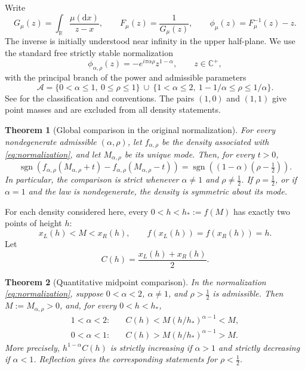\documentclass[11pt,a4paper]{article}
\newtheorem{theorem}{Theorem}[section]
\theoremstyle{definition}
\theoremstyle{remark}
\numberwithin{equation}{section}
\newcommand{\R}{\mathbb{R}}
\newcommand{\Cplus}{\mathbb{C}^{+}}
\newcommand{\sign}{\operatorname{sgn}}
\newcommand{\hp}{h_\ast}
\begin{document}
Write
\[
 G_\mu(z)=\int_{\R}\frac{\mu(\mathrm dx)}{z-x},\qquad
 F_\mu(z)=\frac1{G_\mu(z)},\qquad
 \phi_\mu(z)=F_\mu^{-1}(z)-z .
\]
The inverse is initially understood near infinity in the upper
half-plane. We use the standard free strictly stable normalization
\begin{equation}\label{eq:normalization}
 \phi_{\alpha,\rho}(z)=-e^{i\pi\alpha\rho}z^{1-\alpha},
 \qquad z\in\Cplus ,
\end{equation}
with the principal branch of the power and admissible parameters
\begin{equation}\label{eq:admissible}
 \mathcal A=
 \{0<\alpha\le1,\ 0\le\rho\le1\}
 \ \cup\
 \{1<\alpha\le2,\ 1-1/\alpha\le\rho\le1/\alpha\}.
\end{equation}
See \cite{BP,HK,HSW} for the classification and conventions. The pairs
$(1,0)$ and $(1,1)$ give point masses and are excluded from all density
statements.

\begin{theorem}[Global comparison in the original normalization]
\label{thm:strict}
For every nondegenerate admissible $(\alpha,\rho)$, let
$f_{\alpha,\rho}$ be the density associated with
\eqref{eq:normalization}, and let $M_{\alpha,\rho}$ be its unique mode.
Then, for every $t>0$,
\begin{equation}\label{eq:main}
 \boxed{\;
 \sign\!\left(
 f_{\alpha,\rho}(M_{\alpha,\rho}+t)
 -f_{\alpha,\rho}(M_{\alpha,\rho}-t)\right)
 =
 \sign\!\left((1-\alpha)(\rho-\tfrac12)\right).
 \;}
\end{equation}
In particular, the comparison is strict whenever
$\alpha\ne1$ and $\rho\ne\tfrac12$. If $\rho=\tfrac12$, or if
$\alpha=1$ and the law is nondegenerate, the density is symmetric about
its mode.
\end{theorem}

For each density considered here, every $0<h<\hp:=f(M)$ has exactly two
points of height $h$:
\[
 x_L(h)<M<x_R(h),\qquad
 f(x_L(h))=f(x_R(h))=h.
\]
Let
\begin{equation}\label{eq:midpoint-def}
 C(h)=\frac{x_L(h)+x_R(h)}2.
\end{equation}

\begin{theorem}[Quantitative midpoint comparison]
\label{thm:midpoint}
In the normalization \eqref{eq:normalization}, suppose
$0<\alpha<2$, $\alpha\ne1$, and $\rho>\tfrac12$ is admissible.
Then $M:=M_{\alpha,\rho}>0$, and, for every $0<h<\hp$,
\begin{align}
 1<\alpha<2:\quad&
 C(h)<M(h/\hp)^{\alpha-1}<M,
 \label{eq:midpoint-upper}\\
 0<\alpha<1:\quad&
 C(h)>M(h/\hp)^{\alpha-1}>M.
 \label{eq:midpoint-lower}
\end{align}
More precisely, $h^{1-\alpha}C(h)$ is strictly increasing if
$\alpha>1$ and strictly decreasing if $\alpha<1$.
Reflection gives the corresponding statements for $\rho<\tfrac12$.
\end{theorem}
\end{document}
